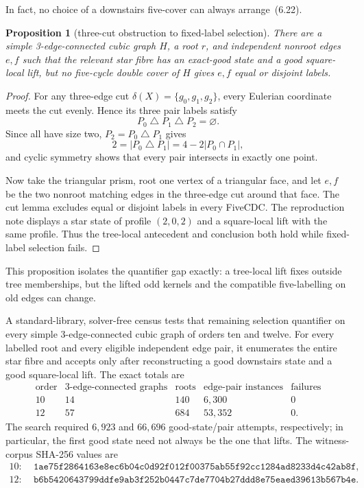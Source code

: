 \documentclass[11pt]{article}
\newtheorem{proposition}[theorem]{Proposition}
\theoremstyle{definition}
\theoremstyle{remark}
\newcommand{\symdiff}{\mathbin{\triangle}}
\newcommand{\1}{\mathbf 1}
\begin{document}
In fact, no choice of a downstairs five-cover can always arrange~(6.22).

\begin{proposition}[three-cut obstruction to fixed-label selection]
\label{prop:square-cut-nogo}
There are a simple 3-edge-connected cubic graph \(H\), a root \(r\), and
independent nonroot edges \(e,f\) such that the relevant star fibre has an
exact-good state and a good square-local lift, but no five-cycle double
cover of \(H\) gives \(e,f\) equal or disjoint labels.
\end{proposition}

\begin{proof}
For any three-edge cut
\(\delta(X)=\{g_0,g_1,g_2\}\), every Eulerian coordinate meets the cut
evenly.  Hence its three pair labels satisfy
\[
                         P_0\symdiff P_1\symdiff P_2=\varnothing.
                                                               \tag{6.23}
\]
Since all have size two, \(P_2=P_0\symdiff P_1\) gives
\[
 2=|P_0\symdiff P_1|=4-2|P_0\cap P_1|,
\]
and cyclic symmetry shows that every pair intersects in exactly one point.

Now take the triangular prism, root one vertex of a triangular face, and
let \(e,f\) be the two nonroot matching edges in the three-edge cut around
that face.  The cut lemma excludes equal or disjoint labels in every
FiveCDC.  The reproduction note displays a star state of profile
\((2,0,2)\) and a square-local lift with the same profile.  Thus the
tree-local antecedent and conclusion both hold while fixed-label selection
fails.
\end{proof}

This proposition isolates the quantifier gap exactly: a tree-local lift
fixes outside tree memberships, but the lifted odd kernels and the
compatible five-labelling on old edges can change.

A standard-library, solver-free census tests that remaining selection
quantifier on every simple 3-edge-connected cubic graph of orders ten and
twelve.  For every labelled root and every eligible independent edge pair,
it enumerates the entire star fibre and accepts only after reconstructing a
good downstairs state and a good square-local lift.  The exact totals are
\[
\begin{array}{c|rrrr}
\text{order}&\text{3-edge-connected graphs}&\text{roots}
 &\text{edge-pair instances}&\text{failures}\\ \hline
10&14&140&6{,}300&0\\
12&57&684&53{,}352&0.
\end{array}
\]
The search required \(6{,}923\) and \(66{,}696\) good-state/pair attempts,
respectively; in particular, the first good state need not always be the
one that lifts.  The witness-corpus SHA-256 values are
\[
\begin{split}
10:\;&\texttt{1ae75f2864163e8ec6b04c0d92f012f00375ab55f92cc1284ad8233d4c42ab8f},\\
12:\;&\texttt{b6b5420643799ddfe9ab3f252b0447c7de7704b27ddd8e75eaed39613b567b4e}.
\end{split}
\]
\end{document}
